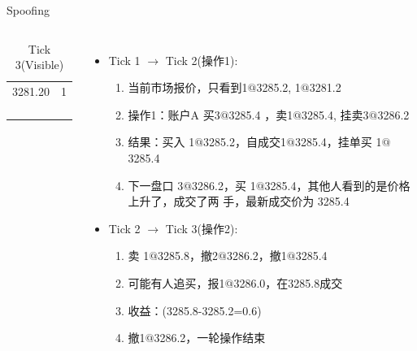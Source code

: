\begin{frame}{Spoofing}
\begin{columns}
\begin{table}
\begin{subtable}[b]{0.4\textwidth}
{\begin{tabular}{|c|c|}
          \arrayrulecolor{orange}\hline
          \rowcolor{mypink}
          3281.20 & 1\\
          \arrayrulecolor{orange}\hline
          \rowcolor{mypink}
          {} & {}\\
          \arrayrulecolor{orange}\hline
          \rowcolor{mypink}
          {} & {}\\
          \arrayrulecolor{orange}\hline
          \rowcolor{mypink}
          {} & {}\\
          \arrayrulecolor{orange}\hline
        \end{tabular}
      }
      \caption*{\scriptsize{Tick 3(Visible)}}
    \end{subtable}
  \end{table}
  \column{5cm}
  \begin{itemize}
  \item Tick 1 $\to$ Tick 2(操作1):
    \begin{enumerate}[<+-|alert@+>]
    \item 当前市场报价，只看到1$@$3285.2, 1$@$3281.2
    \item 操作1：账户A 买3$@$3285.4 ，卖1$@$3285.4, 挂卖3$@$3286.2
    \item 结果：买入 1$@$3285.2，自成交1$@$3285.4，挂单买 1$@$3285.4
    \item 下一盘口 3$@$3286.2，买 1$@$3285.4，其他人看到的是价格上升了，成交了两
      手，最新成交价为 3285.4
    \end{enumerate}
  \item Tick 2 $\to$ Tick 3(操作2):
    \begin{enumerate}[<+-|alert@+>]
    \item 卖 1$@$3285.8，撤2$@$3286.2，撤1$@$3285.4 
    \item 可能有人追买，报1$@$3286.0，在3285.8成交
    \item 收益：(3285.8-3285.2=0.6)
    \item 撤1$@$3286.2，一轮操作结束
    \end{enumerate}
  \end{itemize}
  \end{columns}
\end{frame}

